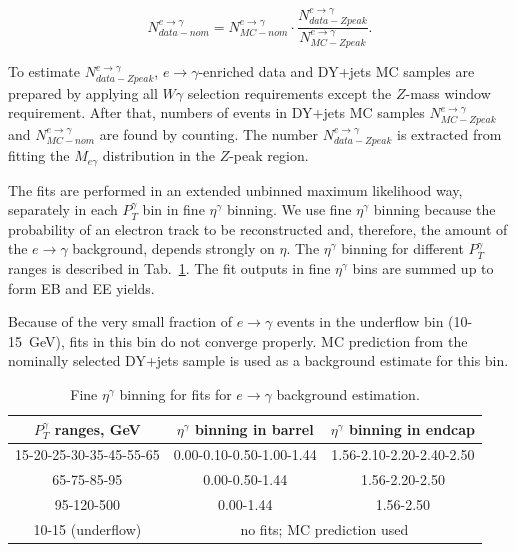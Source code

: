 \begin{equation}\label{eq:Scale_etog}
N_{data-nom}^{e\rightarrow\gamma} = N_{MC-nom}^{e\rightarrow\gamma} \cdot \frac{N_{data-Zpeak}^{e\rightarrow\gamma}}{N_{MC-Zpeak}^{e\rightarrow\gamma}}. 
\end{equation}

To estimate $N_{data-Zpeak}^{e\rightarrow\gamma}$, $e\rightarrow\gamma$-enriched data and DY+jets MC samples are prepared by applying all $W\gamma$ selection requirements except the $Z$-mass window requirement. After that, numbers of events in DY+jets MC samples $N_{MC-Zpeak}^{e\rightarrow\gamma}$ and $N_{MC-nom}^{e\rightarrow\gamma}$ are found by counting. The number $N_{data-Zpeak}^{e\rightarrow\gamma}$ is extracted from fitting the $M_{e\gamma}$ distribution in the $Z$-peak region.

The fits are performed in an extended unbinned maximum likelihood way, separately in each $P_T^\gamma$ bin in fine $\eta^\gamma$ binning. We use fine $\eta^{\gamma}$ binning because the probability of an electron track to be reconstructed and, therefore, the amount of the $e\rightarrow\gamma$ background, depends strongly on $\eta$. The $\eta^\gamma$ binning for different $P_T^\gamma$ ranges is described in Tab.~\ref{tab:fine_eta_binning}. The fit outputs in fine $\eta^{\gamma}$ bins are summed up to form EB and EE yields. 

Because of the very small fraction of $e\rightarrow\gamma$ events in the underflow bin (10-15~GeV), fits in this bin do not converge properly. MC prediction from the nominally selected DY+jets sample is used as a background estimate for this bin. 

\begin{table}[h]
  \small
  \begin{center}
    \caption{Fine $\eta^{\gamma}$ binning for fits for $e\rightarrow\gamma$ background estimation.}
    \begin{tabular}{|c|c|c|}
      \hline
      $P_T^{\gamma}$ ranges, GeV & $\eta^{\gamma}$ binning in barrel & $\eta^{\gamma}$ binning in endcap  \\ \hline
      15-20-25-30-35-45-55-65 & 0.00-0.10-0.50-1.00-1.44         & 1.56-2.10-2.20-2.40-2.50  \\ \hline
      65-75-85-95             & 0.00-0.50-1.44                   & 1.56-2.20-2.50  \\ \hline
      95-120-500              & 0.00-1.44                        & 1.56-2.50  \\ \hline
      10-15 (underflow)       & \multicolumn{2}{|c|}{no fits; MC prediction used} \\ \hline
    \end{tabular}
    \label{tab:fine_eta_binning}
  \end{center}
\end{table} 

